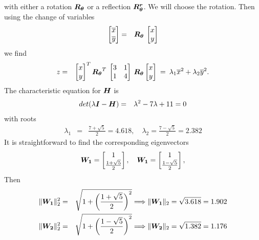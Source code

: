 \documentclass[11pt]{SelfArxOneColBMN}
\begin{document}
with either a rotation $\boldsymbol{R_\theta}$ or a reflection $\boldsymbol{R_\theta^r}$.
We will choose the rotation.  Then using
the change of variables
\begin{eqnarray*}
\begin{bmatrix} \overline{x}\\\overline{y}\end{bmatrix}
&=& \boldsymbol{R_\theta} \: \begin{bmatrix} x\\y\end{bmatrix}
\end{eqnarray*}
\noindent
we find
\begin{eqnarray*}
z &=&
\begin{bmatrix} x\\y\end{bmatrix}^T  \boldsymbol{R_\theta}^T
\: 
\begin{bmatrix} 3 & 1 \\ 1 & 4 \end{bmatrix}
\: \boldsymbol{R_\theta} \begin{bmatrix} x\\y\end{bmatrix}
\: = \:
\lambda_1 \overline{x}^2 + \lambda_2 \overline{y}^2.
\end{eqnarray*}
\noindent
The characteristic equation for $\boldsymbol{H}$ is
\begin{eqnarray*}
det(\lambda \boldsymbol{I} - \boldsymbol{H}) &=& \lambda^2 -7 \lambda +11 = 0
\end{eqnarray*}
\noindent
with roots
\begin{eqnarray*}
\lambda_1 &=& \frac{7 + \sqrt{5}}{2} = 4.618, \quad
\lambda_2 = \frac{7 - \sqrt{5}}{2} = 2.382
\end{eqnarray*}
\noindent
It is straightforward to find the corresponding eigenvectors
\begin{eqnarray*}
\boldsymbol{W_1} = \begin{bmatrix} 1 \\ \frac{1+\sqrt{5}}{2} \end{bmatrix}, \quad
\boldsymbol{W_1} = \begin{bmatrix} 1 \\ \frac{1-\sqrt{5}}{2} \end{bmatrix},
\end{eqnarray*}
\noindent
Then 
\begin{eqnarray*}
\| \boldsymbol{W_1}\|_2^2 &=& \sqrt{ 1 + \left(\frac{1+\sqrt{5}}{2}\right)^2}
\Longrightarrow 
\| \boldsymbol{W_1}\|_2 = \sqrt{3.618} = 1.902\\
\| \boldsymbol{W_2}\|_2^2 &=& \sqrt{ 1 + \left(\frac{1-\sqrt{5}}{2}\right)^2}
\Longrightarrow 
\| \boldsymbol{W_2}\|_2 = \sqrt{1.382} = 1.176
\end{eqnarray*}
\end{document}
